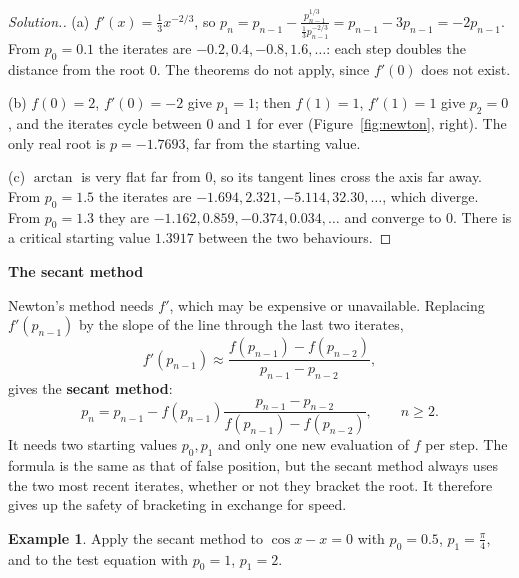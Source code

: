 \documentclass[11pt,a4paper]{article}
\numberwithin{equation}{section}
\theoremstyle{definition}
\newtheorem{exa}[thm]{Example}
\newenvironment{solution}
  {\renewcommand{\qedsymbol}{}\begin{proof}[\textit{Solution}.]}
  {\end{proof}}
\newcommand{\subhead}[1]{%
  \par\medskip\noindent\textbf{#1}\par\nobreak\smallskip}
\begin{document}
\begin{solution}
(a) $f'(x) = \frac13x^{-2/3}$, so $p_n = p_{n-1}-\frac{p_{n-1}^{1/3}}{\frac13p_{n-1}^{-2/3}} = p_{n-1}-3p_{n-1} = -2p_{n-1}$. From $p_0 = 0.1$ the
iterates are $-0.2, 0.4, -0.8, 1.6,\dots$: each step doubles the distance from the root $0$. The theorems do not apply, since $f'(0)$ does
not exist.

(b) $f(0) = 2$, $f'(0) = -2$ give $p_1 = 1$; then $f(1) = 1$, $f'(1) = 1$ give $p_2 = 0$, and the iterates cycle between $0$ and $1$
for ever (Figure~\ref{fig:newton}, right). The only real root is $p = -1.7693$, far from the starting value.

(c) $\arctan$ is very flat far from $0$, so its tangent lines cross the axis far away. From $p_0 = 1.5$ the iterates are
$-1.694, 2.321, -5.114, 32.30,\dots$, which diverge. From $p_0 = 1.3$ they are $-1.162, 0.859, -0.374, 0.034,\dots$ and converge to $0$. There is
a critical starting value $1.3917$ between the two behaviours.
\end{solution}

\subhead{The secant method}
Newton's method needs $f'$, which may be expensive or unavailable. Replacing $f'(p_{n-1})$ by the slope of the line through the last two
iterates,
$$f'(p_{n-1})\approx\frac{f(p_{n-1})-f(p_{n-2})}{p_{n-1}-p_{n-2}},$$
gives the \textbf{secant method}:
\begin{equation}\label{eq:secant}
p_n = p_{n-1}-f(p_{n-1})\frac{p_{n-1}-p_{n-2}}{f(p_{n-1})-f(p_{n-2})},\qquad n\geq2 .
\end{equation}
It needs two starting values $p_0, p_1$ and only one new evaluation of $f$ per step. The formula is the same as that of false position,
but the secant method always uses the two most recent iterates, whether or not they bracket the root. It therefore gives up the safety of
bracketing in exchange for speed.

\begin{exa}
\label{exa:secant}
Apply the secant method to $\cos x-x = 0$ with $p_0 = 0.5$, $p_1 = \frac\pi4$, and to the test equation with $p_0 = 1$, $p_1 = 2$.
\end{exa}
\end{document}
